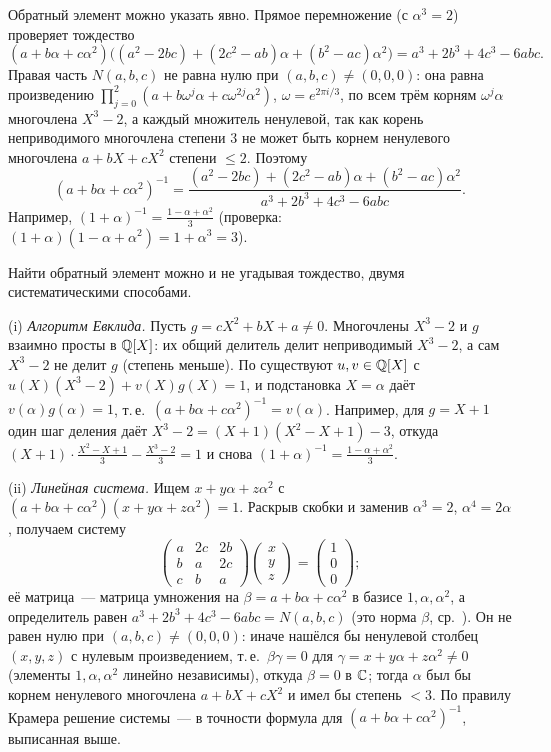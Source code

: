 Обратный элемент можно указать явно. Прямое перемножение (с $\alpha^3=2$) проверяет тождество
\[
(a+b\alpha+c\alpha^2)\bigl((a^2-2bc)+(2c^2-ab)\alpha+(b^2-ac)\alpha^2\bigr)=a^3+2b^3+4c^3-6abc .
\]
Правая часть $N(a,b,c)$ не равна нулю при $(a,b,c)\ne(0,0,0)$: она равна произведению
$\prod_{j=0}^2(a+b\omega^j\alpha+c\omega^{2j}\alpha^2)$, $\omega=e^{2\pi i/3}$, по всем трём корням $\omega^j\alpha$ многочлена $X^3-2$, а
каждый множитель ненулевой, так как корень неприводимого многочлена степени $3$ не может быть корнем ненулевого
многочлена $a+bX+cX^2$ степени $\le2$. Поэтому
\[
(a+b\alpha+c\alpha^2)^{-1}=\frac{(a^2-2bc)+(2c^2-ab)\alpha+(b^2-ac)\alpha^2}{a^3+2b^3+4c^3-6abc}.
\]
Например, $(1+\alpha)^{-1}=\frac{1-\alpha+\alpha^2}3$ (проверка: $(1+\alpha)(1-\alpha+\alpha^2)=1+\alpha^3=3$).

Найти обратный элемент можно и не угадывая тождество, двумя систематическими способами.

(i) \emph{Алгоритм Евклида.} Пусть $g=cX^2+bX+a\ne0$. Многочлены $X^3-2$ и $g$ взаимно просты в $\mathbb Q[X]$: их общий
делитель делит неприводимый $X^3-2$, а сам $X^3-2$ не делит $g$ (степень меньше). По  существуют $u,v\in\mathbb Q[X]$ с
$u(X)(X^3-2)+v(X)g(X)=1$, и подстановка $X=\alpha$ даёт $v(\alpha)g(\alpha)=1$, т.\,е.\ $(a+b\alpha+c\alpha^2)^{-1}=v(\alpha)$.
Например, для $g=X+1$ один шаг деления даёт $X^3-2=(X+1)(X^2-X+1)-3$, откуда $(X+1)\cdot\frac{X^2-X+1}3-\frac{X^3-2}3=1$ и
снова $(1+\alpha)^{-1}=\frac{1-\alpha+\alpha^2}3$.

(ii) \emph{Линейная система.} Ищем $x+y\alpha+z\alpha^2$ с $(a+b\alpha+c\alpha^2)(x+y\alpha+z\alpha^2)=1$. Раскрыв скобки
и заменив $\alpha^3=2$, $\alpha^4=2\alpha$, получаем систему
\[
\begin{pmatrix}a&2c&2b\\ b&a&2c\\ c&b&a\end{pmatrix}\begin{pmatrix}x\\ y\\ z\end{pmatrix}=\begin{pmatrix}1\\0\\0\end{pmatrix};
\]
её матрица~--- матрица умножения на $\beta=a+b\alpha+c\alpha^2$ в базисе $1,\alpha,\alpha^2$, а определитель равен
$a^3+2b^3+4c^3-6abc=N(a,b,c)$ (это норма $\beta$, ср.\ ). Он не равен нулю при $(a,b,c)\ne(0,0,0)$: иначе
нашёлся бы ненулевой столбец $(x,y,z)$ с нулевым произведением, т.\,е.\ $\beta\gamma=0$ для $\gamma=x+y\alpha+z\alpha^2\ne0$
(элементы $1,\alpha,\alpha^2$ линейно независимы), откуда $\beta=0$ в $\mathbb C$; тогда $\alpha$ был бы корнем ненулевого
многочлена $a+bX+cX^2$ и имел бы степень $<3$. По правилу Крамера решение системы~--- в точности формула для
$(a+b\alpha+c\alpha^2)^{-1}$, выписанная выше.

